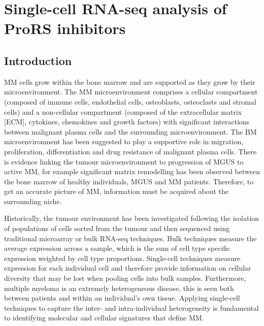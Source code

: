 \chapter{Single-cell RNA-seq analysis of ProRS inhibitors}\label{ch:6-sc}

\section{Introduction}
MM cells grow within the bone marrow and are supported as they grow by their microenvironment.
The MM microenvironment comprises a cellular compartment (composed of immune cells, endothelial cells, osteoblasts, osteoclasts and stromal cells) and a non-cellular compartment (composed of the extracellular matrix [ECM], cytokines, chemokines and growth factors)\cite{manier2012bone, kawano2015targeting} with significant interactions between malignant plasma cells and the surrounding microenvironment.
The BM microenvironment has been suggested to play a supportive role in migration, proliferation, differentiation and drug resistance of malignant plasma cells\cite{ho2020role, manier2012bone}.
There is evidence linking the tumour microenvironment to progression of MGUS to active MM, for example significant matrix remodelling has been observed between the bone marrow of healthy individuals, MGUS and MM patients\cite{kawano2015targeting}.
Therefore, to get an accurate picture of MM, information must be acquired about the surrounding niche.

Historically, the tumour environment has been investigated following the isolation of populations of cells sorted from the tumour and then sequenced using traditional microarray or bulk RNA-seq techniques.
Bulk techniques measure the average expression across a sample, which is the sum of cell type specific expression weighted by cell type proportions.
Single-cell techniques measure expression for each individual cell and therefore provide information on cellular diversity that may be lost when pooling cells into bulk samples.
Furthermore, multiple myeloma is an extremely heterogeneous disease, this is seen both between patients and within an individual's own tissue.
Applying single-cell techniques to capture the inter- and intra-individual heterogeneity is fundamental to identifying molecular and cellular signatures that define MM\@.

